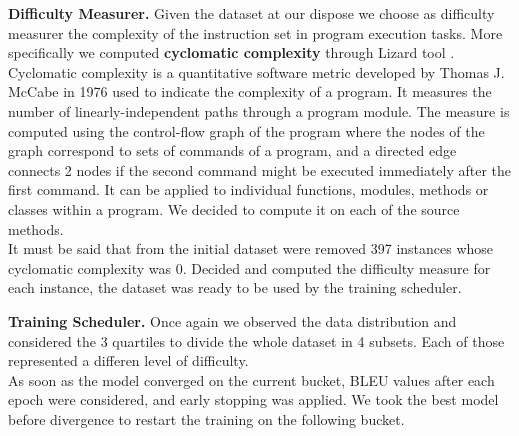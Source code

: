 
\textbf{Difficulty Measurer.} Given the dataset at our dispose we choose as difficulty measurer the 
complexity of the instruction set in program execution tasks. More specifically we 
computed \textbf{cyclomatic complexity} through Lizard tool \cite{lizard}. Cyclomatic complexity
is a quantitative software metric developed by Thomas J. McCabe in 1976 used to indicate
the complexity of a program.  
It measures the number of linearly-independent paths through a program module. 
The measure is computed using the control-flow graph of the program where
the nodes of the graph correspond to sets of commands of a program, and
a directed edge connects 2 nodes if the second command might be executed
immediately after the first command. It can be applied to individual functions,
modules, methods or classes within a program. We decided to compute it on each of
the source methods.\\
It must be said that from the initial dataset were removed 397 instances whose
cyclomatic complexity was 0. Decided and computed the difficulty measure
for each instance, the dataset was ready to be used by the training scheduler.


\textbf{Training Scheduler.} Once again we observed the data distribution and considered the 3 quartiles
to divide the whole dataset in 4 subsets. Each of those represented a differen level of difficulty.\\
As soon as the model converged on the current bucket, BLEU values after each epoch were considered,
and early stopping was applied. We took the best model before divergence to restart the training 
on the following bucket. 








